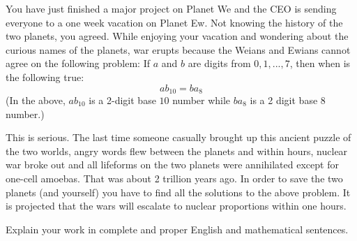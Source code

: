 You have just finished a major project on Planet We and the CEO is sending
everyone to a one week vacation on Planet Ew.
Not knowing the history of the two planets, you agreed.
While enjoying your vacation and wondering about the curious names of the
planets, war erupts because the Weians and Ewians cannot agree on the
following problem:
If $a$ and $b$ are digits from $0,1,...,7$, then when is the following true:
\[
ab_{10} = ba_{8}
\]
(In the above, $ab_{10}$ is a 2-digit base $10$ number while
$ba_{8}$ is a 2 digit base 8 number.)

This is serious.
The last time someone casually brought up this ancient puzzle of the two
worlds,
angry words flew between the planets and within hours,
nuclear war broke out and all lifeforms on the two planets were
annihilated except for one-cell amoebas.
That was about 2 trillion years ago.
In order to save the two planets (and yourself)
you have to find all the solutions to the above problem.
It is projected that the wars will escalate to nuclear
proportions within one hours.

Explain your work in complete and proper English and mathematical
sentences.
